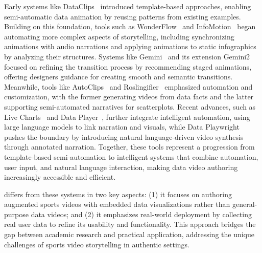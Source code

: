 Early systems like DataClips~\cite{DBLP:journals/tvcg/AminiRLMI17} introduced template-based approaches, enabling semi-automatic data animation by reusing patterns from existing examples. Building on this foundation, tools such as WonderFlow~\cite{DBLP:journals/corr/abs-2308-04040} and InfoMotion~\cite{DBLP:journals/cgf/WangGHCZZ21} began automating more complex aspects of storytelling, including synchronizing animations with audio narrations and applying animations to static infographics by analyzing their structures. Systems like Gemini~\cite{DBLP:journals/tvcg/KimH21} and its extension Gemini2~\cite{DBLP:conf/visualization/KimH21} focused on refining the transition process by recommending staged animations, offering designers guidance for creating smooth and semantic transitions. 
Meanwhile, tools like AutoClips~\cite{DBLP:journals/cgf/ShiSXLGC21} and Roslingifier~\cite{DBLP:journals/tvcg/ShinKHXWKKE23} emphasized automation and customization, with the former generating videos from data facts and the latter supporting semi-automated narratives for scatterplots. 
Recent advances, such as Live Charts~\cite{DBLP:journals/corr/abs-2309-02967} and Data Player~\cite{DBLP:journals/tvcg/ShenZZW24}, further integrate intelligent automation, using large language models to link narration and visuals, while Data Playwright~\cite{DBLP:journals/corr/abs-2410-03093} pushes the boundary by introducing natural language-driven video synthesis through annotated narration. 
Together, these tools represent a progression from template-based semi-automation to intelligent systems that combine automation, user input, and natural language interaction, making data video authoring increasingly accessible and efficient.

\SB{} differs from these systems in two key aspects: (1) it focuses on authoring augmented sports videos with embedded data visualizations rather than general-purpose data videos; and (2) it emphasizes real-world deployment by collecting real user data to refine its usability and functionality. This approach bridges the gap between academic research and practical application, addressing the unique challenges of sports video storytelling in authentic settings.

